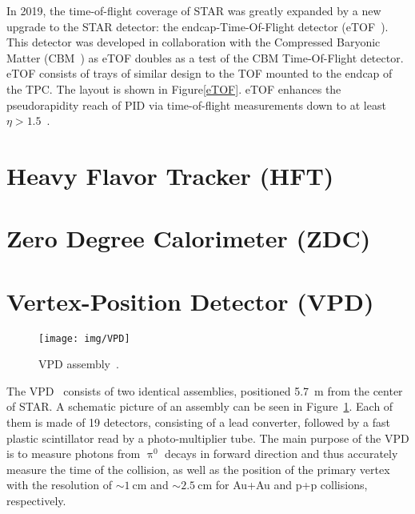 In 2019, the time-of-flight coverage of STAR was greatly expanded by a new upgrade to the STAR detector: the endcap-Time-Of-Flight detector (eTOF~\cite{eTOF})\@. This detector was developed in collaboration with the Compressed Baryonic Matter (CBM~\cite{CBM}) as eTOF doubles as a test of the CBM Time-Of-Flight detector. eTOF consists of trays of similar design to the TOF mounted to the endcap of the TPC\@. The layout is shown in Figure\ref{eTOF}\@. eTOF enhances the pseudorapidity reach of PID via time-of-flight measurements down to at least $\eta > 1.5$~\cite{eTOF_LOI}\@.


\section{Heavy Flavor Tracker (HFT)\label{HFTsection}} 



\section{Zero Degree Calorimeter (ZDC)\label{ZDCsection}}






\section{Vertex-Position Detector (VPD)\label{VPD}}

\begin{figure}[!htb]
\begin{center}
 \texttt{[image: img/VPD]}\\
\end{center}
\caption[VPD assembly.]{\label{VPDassembly}VPD assembly~\cite{VPD}.}
\end{figure}

The VPD~\cite{VPD} consists of two identical assemblies, positioned \SI{5.7}{\metre} from the center of STAR\@. A schematic 
picture of an assembly can be seen in Figure~\ref{VPDassembly}. Each of them is made of 19 detectors, consisting of a lead 
converter, followed by a fast plastic scintillator read by a photo-multiplier tube. The main purpose of the VPD is to measure 
photons from $\uppi^0$ decays in forward direction and thus accurately measure the time of the collision, as well as 
the position of the primary vertex with the resolution of $\sim \SI{1}{\centi\metre}$ and  $\sim \SI{2.5}{\centi\metre}$ 
for Au+Au and p+p collisions, respectively.

